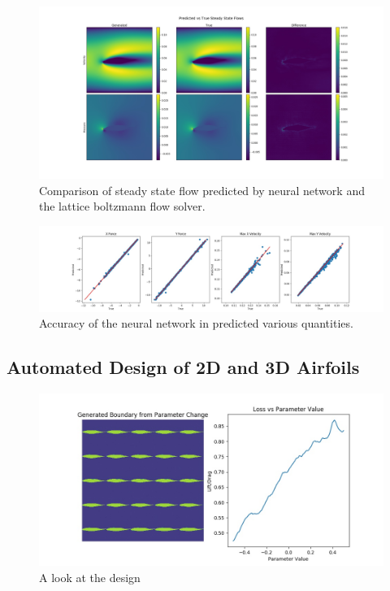 \documentclass{article} %
\begin{document}
\begin{figure}[!t]
\begin{center}
\includegraphics[scale=0.30]{../test/figs/generated_flow_difference.jpeg}
\end{center}
\caption{Comparison of steady state flow predicted by neural network and the lattice boltzmann flow solver.}
\label{flow_accuracy}
\end{figure}

\begin{figure}[h]
\begin{center}
\includegraphics[scale=0.30]{../test/figs/flow_accuracy_2d.jpeg}
\end{center}
\caption{Accuracy of the neural network in predicted various quantities.}
\end{figure}

\subsection{Automated Design of 2D and 3D Airfoils}

\begin{figure}[h]
\begin{center}
\includegraphics[scale=0.30]{../test/figs/boundary_space_explore.jpeg}
\end{center}
\caption{A look at the design }
\end{figure}
\end{document}
